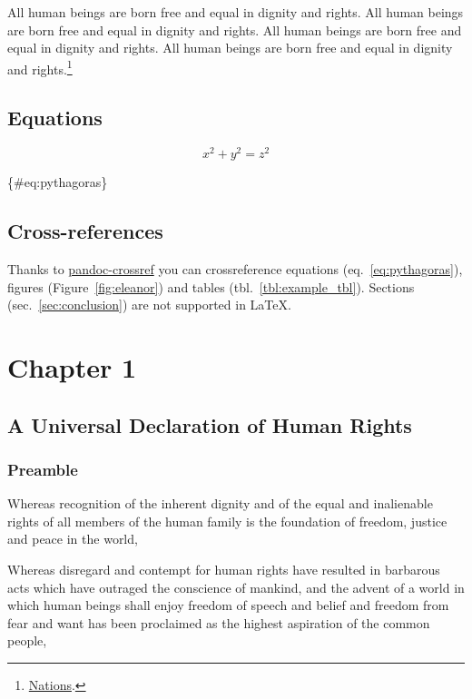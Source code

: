 \documentclass[
  titlepage,
  openright,
  DIV=calc,
  toc=listof,
  listof=nochaptergap]{scrbook}
\begin{document}
All human beings are born free and equal in dignity and rights. All
human beings are born free and equal in dignity and rights. All human
beings are born free and equal in dignity and rights. All human beings
are born free and equal in dignity and rights.\footnote{\protect\hyperlink{ref-unitednations1948}{Nations}.}

\hypertarget{equations}{%
\section{Equations}\label{equations}}

\[
x^2 + y^2 = z^2
\]

\{\#eq:pythagoras\}

\hypertarget{cross-references}{%
\section{Cross-references}\label{cross-references}}

Thanks to
\href{https://lierdakil.github.io/pandoc-crossref/}{pandoc-crossref} you
can crossreference equations (eq.~\ref{eq:pythagoras}), figures
(Figure~\ref{fig:eleanor}) and tables (tbl.~\ref{tbl:example_tbl}).
Sections (sec.~\ref{sec:conclusion}) are not supported in LaTeX.

\hypertarget{sec:chapter1}{%
\chapter{Chapter 1}\label{sec:chapter1}}

\hypertarget{a-universal-declaration-of-human-rights}{%
\section{A Universal Declaration of Human
Rights}\label{a-universal-declaration-of-human-rights}}

\hypertarget{preamble}{%
\subsection{Preamble}\label{preamble}}

Whereas recognition of the inherent dignity and of the equal and
inalienable rights of all members of the human family is the foundation
of freedom, justice and peace in the world,

Whereas disregard and contempt for human rights have resulted in
barbarous acts which have outraged the conscience of mankind, and the
advent of a world in which human beings shall enjoy freedom of speech
and belief and freedom from fear and want has been proclaimed as the
highest aspiration of the common people,
\end{document}

